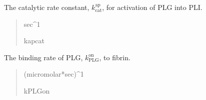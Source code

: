 \documentclass[letterpaper,10pt,english]{sphinxmanual}
\begin{document}
\begin{fulllineitems}
\begin{fulllineitems}
\label{\detokenize{lysis.util:lysis.util.parameters.MicroParameters.activation_rate_PLG}}
\pysigstartsignatures
{}
\pysigstopsignatures
\sphinxAtStartPar
The catalytic rate constant, \(k_\text{cat}^\text{ap}\),
for activation of PLG into PLI.
\begin{quote}\begin{description}
\sphinxAtStartPar
sec\textasciicircum{}\sphinxhyphen{}1

\sphinxAtStartPar
kapcat

\end{description}\end{quote}

\end{fulllineitems}


\begin{fulllineitems}
\label{\detokenize{lysis.util:lysis.util.parameters.MicroParameters.bind_rate_PLG}}
\pysigstartsignatures
{}
\pysigstopsignatures
\sphinxAtStartPar
The binding rate of PLG, \(k^\text{on}_\text{PLG}\), to fibrin.
\begin{quote}\begin{description}
\sphinxAtStartPar
(micromolar*sec)\textasciicircum{}\sphinxhyphen{}1

\sphinxAtStartPar
kPLGon

\end{description}\end{quote}

\end{fulllineitems}



\end{fulllineitems}
\end{document}

